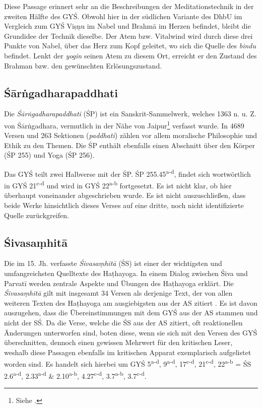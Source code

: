 \documentclass[a4paper,12pt]{article}
\begin{document}
Diese Passage erinnert sehr an die Beschreibungen der Meditationstechnik in der zweiten Hälfte des GYŚ. Obwohl hier in der südlichen Variante des DhbU im Vergleich zum GYŚ Viṣṇu im Nabel und Brahmā im Herzen befindet, bleibt die Grundidee der Technik dieselbe. Der Atem bzw. Vitalwind wird durch diese drei Punkte von Nabel, über das Herz zum Kopf geleitet, wo sich die Quelle des \textit{bindu} befindet. Lenkt der \textit{yogin} seinen Atem zu diesem Ort, erreicht er den Zustand des Brahman bzw. den gewünschten Erlösungszustand.

 
\subsection{Śārṅgadharapaddhati}

Die \textit{Śārṅgadharapaddhati} (ŚP) ist ein Sanskrit-Sammelwerk, welches 1363 n. u. Z. von Śārṅgadhara, vermutlich in der Nähe von Jaipur\footnote{Siehe \parencite[233]{mallinson2014b}.} verfasst wurde. In 4689 Versen und 263 Sektionen (\textit{paddhati}) zählen vor allem moralische Philosophie und Ethik zu den Themen. Die ŚP enthält ebenfalls einen Abschnitt über den Körper (ŚP 255) und Yoga (ŚP 256). 

Das GYŚ teilt zwei Halbverse mit der ŚP. ŚP 255.45\textsuperscript{a-d}, findet sich wortwörtlich in GYŚ 21\textsuperscript{c-d} und wird in GYŚ 22\textsuperscript{a-b} fortgesetzt. Es ist nicht klar, ob hier überhaupt voneinander abgeschrieben wurde. Es ist nicht auszuschließen, dass beide Werke hinsichtlich dieses Verses auf eine dritte, noch nicht identifizierte Quelle zurückgreifen.

\subsection{Śivasaṃhitā}
Die im 15. Jh. verfasste \textit{Śivasaṃhitā} (ŚS) ist einer der wichtigsten und umfangreichsten Quelltexte des Haṭhayoga. In einem Dialog zwischen Śiva und Parvatī werden zentrale Aspekte und Übungen des Haṭhayoga erklärt. Die \textit{Śivasaṃhitā} gilt mit insgesamt 34 Versen als derjenige Text, der von allen weiteren Texten des Haṭhayoga am ausgiebigsten aus der AS zitiert \parencite[3]{mallinson2016as}. Es ist davon auszugehen, dass die Übereinstimmungen mit dem GYŚ aus der AS stammen und nicht der SŚ. Da die Verse, welche die ŚS aus der AS zitiert, oft reaktionellen Änderungen unterworfen sind, boten diese, wenn sie sich mit den Versen des GYŚ überschnitten, dennoch einen gewissen Mehrwert für den kritischen Leser, weshalb diese Passagen ebenfalls im kritischen Apparat exemplarisch aufgelistet worden sind. Es handelt sich hierbei um GYŚ 5\textsuperscript{a-d}, 9\textsuperscript{a-d}, 17\textsuperscript{c-d}, 21\textsuperscript{c-d}, 22\textsuperscript{a-b} = ŚS 2.6\textsuperscript{a-d}, 2.33\textsuperscript{a-d} \& 2.10\textsuperscript{a-b}, 4.27\textsuperscript{c-d}, 3.7\textsuperscript{a-b}, 3.7\textsuperscript{c-d}.   
\end{document}
